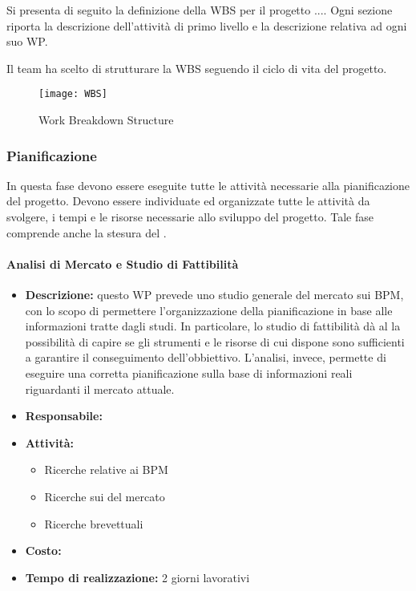 Si presenta di seguito la definizione della WBS per il progetto ....%
Ogni sezione riporta la descrizione dell'attività di primo livello e la descrizione relativa ad ogni suo WP. 

		Il team ha scelto di strutturare la WBS seguendo il ciclo di vita del progetto.
		\begin{figure}[!h]
  		\texttt{[image: WBS]}
		\caption{Work Breakdown Structure}
		\end{figure}

\clearpage


		\subsubsection{Pianificazione}
		In questa fase devono essere eseguite tutte le attività necessarie alla pianificazione del progetto.
		Devono essere individuate ed organizzate tutte le attività da svolgere, i tempi e le risorse necessarie allo sviluppo del progetto. Tale fase comprende anche la stesura del .
		
		\paragraph{Analisi di Mercato e Studio di Fattibilità}

		\begin{itemize}
		\item{\bfseries Descrizione:} 
		questo WP prevede uno studio generale del mercato sui  BPM, con lo scopo di permettere l'organizzazione della pianificazione in base alle informazioni tratte dagli studi.
In particolare, lo studio di fattibilità dà al  la possibilità di capire se gli strumenti e le risorse di cui dispone sono sufficienti a garantire il conseguimento dell'obbiettivo.
L'analisi, invece, permette di eseguire una corretta pianificazione sulla base di informazioni reali riguardanti il mercato attuale. 
		\item {\bfseries Responsabile:}
		\item  {\bfseries Attività:}
			\begin{itemize}
				\item Ricerche relative ai \sw BPM 
				\item Ricerche sui  del mercato
				\item Ricerche brevettuali
			\end{itemize}
		\item  {\bfseries Costo:}
		\item  {\bfseries Tempo di realizzazione: }2 giorni lavorativi
		\end{itemize}



